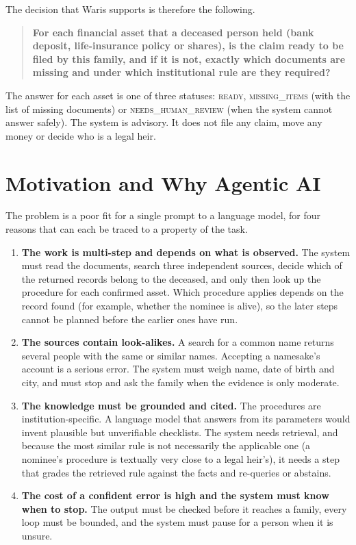 The decision that Waris supports is therefore the following.

\begin{quote}
\textbf{For each financial asset that a deceased person held (bank deposit, life-insurance policy or shares), is the claim ready to be filed by this family, and if it is not, exactly which documents are missing and under which institutional rule are they required?}
\end{quote}

The answer for each asset is one of three statuses: \textsc{ready}, \textsc{missing\_items} (with the list of missing documents) or \textsc{needs\_human\_review} (when the system cannot answer safely). The system is advisory. It does not file any claim, move any money or decide who is a legal heir.

\section{Motivation and Why Agentic AI}
The problem is a poor fit for a single prompt to a language model, for four reasons that can each be traced to a property of the task.

\begin{enumerate}[leftmargin=*,itemsep=2pt]
\item \textbf{The work is multi-step and depends on what is observed.} The system must read the documents, search three independent sources, decide which of the returned records belong to the deceased, and only then look up the procedure for each confirmed asset. Which procedure applies depends on the record found (for example, whether the nominee is alive), so the later steps cannot be planned before the earlier ones have run.
\item \textbf{The sources contain look-alikes.} A search for a common name returns several people with the same or similar names. Accepting a namesake's account is a serious error. The system must weigh name, date of birth and city, and must stop and ask the family when the evidence is only moderate.
\item \textbf{The knowledge must be grounded and cited.} The procedures are institution-specific. A language model that answers from its parameters would invent plausible but unverifiable checklists. The system needs retrieval, and because the most similar rule is not necessarily the applicable one (a nominee's procedure is textually very close to a legal heir's), it needs a step that grades the retrieved rule against the facts and re-queries or abstains.
\item \textbf{The cost of a confident error is high and the system must know when to stop.} The output must be checked before it reaches a family, every loop must be bounded, and the system must pause for a person when it is unsure.
\end{enumerate}

